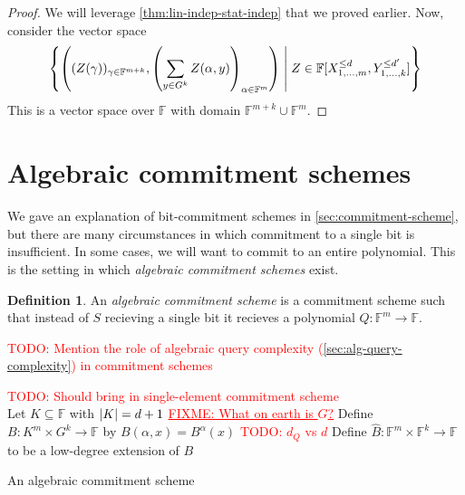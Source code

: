 \documentclass[english,12pt]{reedthesis}
\theoremstyle{plain}
\theoremstyle{definition}
\newtheorem{defn}[defn]{Definition}
\theoremstyle{remark}
\DeclarePairedDelimiter{\abs}{\lvert}{\rvert}
\newcommand{\middlemid}{%
  \ensuremath{\;\middle\vert\;}
}
\newcommand{\TODO}[1]{\textcolor{red}{TODO: #1}}
\newcommand{\FIXME}[1]{\textcolor{red}{\ul{FIXME: #1}}}
\begin{document}
\begin{proof}
  We will leverage \cref{thm:lin-indep-stat-indep} that we proved earlier. Now,
  consider the vector space
  \begin{equation} %
    \mleft\{
      \mleft(
        (Z(\gamma))_{\gamma \in \mathbb{F}^{m+k}}, \mleft(\sum_{y \in G^{k}}Z(\alpha, y)\mright)_{\alpha \in \mathbb{F}^{m}}
      \mright)
      \middlemid
      Z \in \mathbb{F}[X_{1, \ldots, m}^{\le d}, Y_{1, \ldots, k}^{\le d'}]
    \mright\}
  \end{equation}
  This is a vector space over $\mathbb{F}$ with domain
  $\mathbb{F}^{m+k} \cup \mathbb{F}^{m}$. %
\end{proof}


\section{Algebraic commitment schemes}\label{sec:alg-commit-scheme}

We gave an explanation of bit-commitment schemes in
\cref{sec:commitment-scheme}, but there are many circumstances in which
commitment to a single bit is insufficient. In some cases, we will want to
commit to an entire polynomial. This is the setting in which \emph{algebraic
  commitment schemes} exist.

\begin{defn}\label{def:alg-comm-scheme}
  An \emph{algebraic commitment scheme} is a commitment scheme such that instead
  of $S$ recieving a single bit it recieves a polynomial
  $Q\colon \mathbb{F}^{m} \rightarrow \mathbb{F}$.
\end{defn}

\TODO{Mention the role of algebraic query complexity
  (\cref{sec:alg-query-complexity}) in commitment schemes}

\begin{algorithm}[htbp]
  \TODO{Should bring in single-element commitment scheme} \\
  Let $K \subseteq \mathbb{F}$ with $\abs{K} = d + 1$\;
  \FIXME{What on earth is $G$?}
  Define $B\colon K^{m} \times G^{k} \rightarrow \mathbb{F}$ by $B(\alpha, x) = B^{\alpha}(x)$\;
  \TODO{$d_{Q}$ vs $d$}
  Define $\hat{B}\colon \mathbb{F}^{m} \times \mathbb{F}^{k} \rightarrow \mathbb{F}$ to be a
  low-degree extension of
  $B$
  \;
  \caption{An algebraic commitment scheme~\cite[]{CFGS22}}\label{alg:alg-commit-scheme}
\end{algorithm}
\end{document}
